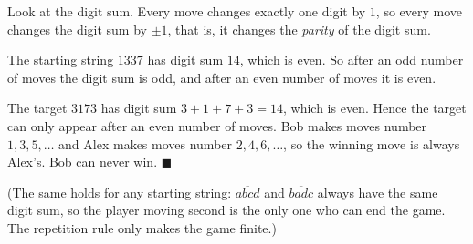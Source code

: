 Look at the digit sum. Every move changes exactly one digit by $1$, so every move changes the digit sum by $\pm1$, that is, it changes the \emph{parity} of the digit sum.

The starting string $1337$ has digit sum $14$, which is even. So after an odd number of moves the digit sum is odd, and after an even number of moves it is even.

The target $3173$ has digit sum $3+1+7+3=14$, which is even. Hence the target can only appear after an even number of moves. Bob makes moves number $1,3,5,\dots$ and Alex makes moves number $2,4,6,\dots$, so the winning move is always Alex's. Bob can never win. $\blacksquare$

(The same holds for any starting string: $\overline{abcd}$ and $\overline{badc}$ always have the same digit sum, so the player moving second is the only one who can end the game. The repetition rule only makes the game finite.)
